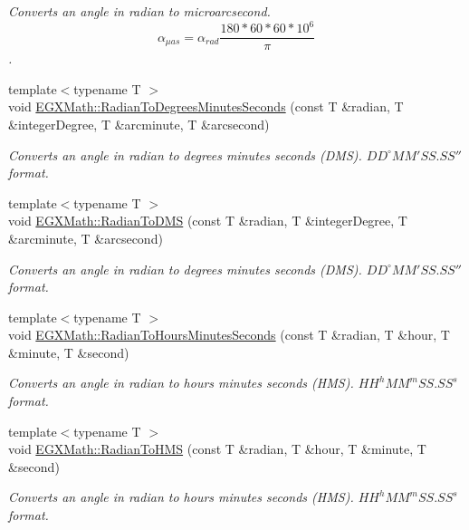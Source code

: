 \begin{DoxyCompactItemize}
\begin{DoxyCompactList}\small\item\em Converts an angle in radian to microarcsecond. \[\alpha_{\mu as}=\alpha_{rad}\frac{180 * 60 * 60 * 10^6}{\pi}\]. \end{DoxyCompactList}\item 
{\footnotesize template$<$typename T $>$ }\\void \mbox{\hyperlink{group___e_g_x_math-_angle_conversions-_radian_gadae98c255924fdc8b232b6539eae81a9}{E\+G\+X\+Math\+::\+Radian\+To\+Degrees\+Minutes\+Seconds}} (const T \&radian, T \&integer\+Degree, T \&arcminute, T \&arcsecond)
\begin{DoxyCompactList}\small\item\em Converts an angle in radian to degrees minutes seconds (D\+MS). ${DD}^{\circ}{MM}'{SS.SS}''$ format. \end{DoxyCompactList}\item 
{\footnotesize template$<$typename T $>$ }\\void \mbox{\hyperlink{group___e_g_x_math-_angle_conversions-_radian_gaf80be0c5c65ccaa5544a08a7754f3575}{E\+G\+X\+Math\+::\+Radian\+To\+D\+MS}} (const T \&radian, T \&integer\+Degree, T \&arcminute, T \&arcsecond)
\begin{DoxyCompactList}\small\item\em Converts an angle in radian to degrees minutes seconds (D\+MS). ${DD}^{\circ}{MM}'{SS.SS}''$ format. \end{DoxyCompactList}\item 
{\footnotesize template$<$typename T $>$ }\\void \mbox{\hyperlink{group___e_g_x_math-_angle_conversions-_radian_ga3467598d89af2b8ff68af50b39bb19e2}{E\+G\+X\+Math\+::\+Radian\+To\+Hours\+Minutes\+Seconds}} (const T \&radian, T \&hour, T \&minute, T \&second)
\begin{DoxyCompactList}\small\item\em Converts an angle in radian to hours minutes seconds (H\+MS). ${HH}^h{MM}^m{SS.SS}^s$ format. \end{DoxyCompactList}\item 
{\footnotesize template$<$typename T $>$ }\\void \mbox{\hyperlink{group___e_g_x_math-_angle_conversions-_radian_ga55b5fba9307f34ab8db57391789a90cc}{E\+G\+X\+Math\+::\+Radian\+To\+H\+MS}} (const T \&radian, T \&hour, T \&minute, T \&second)
\begin{DoxyCompactList}\small\item\em Converts an angle in radian to hours minutes seconds (H\+MS). ${HH}^h{MM}^m{SS.SS}^s$ format. \end{DoxyCompactList}\item 

\end{DoxyCompactItemize}
